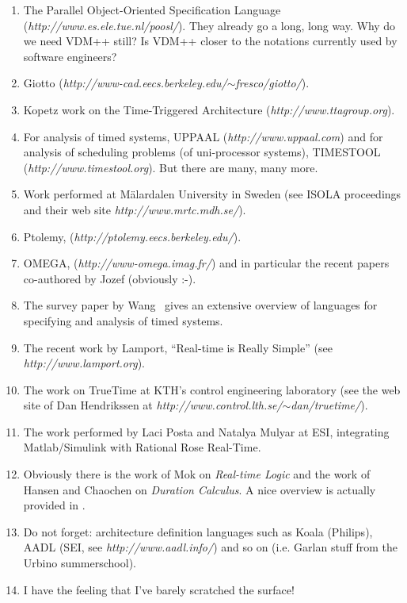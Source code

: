 \documentclass{llncs}
\begin{document}
\begin{enumerate}
\item The Parallel Object-Oriented Specification Language
(\textit{http://www.es.ele.tue.nl/poosl/}). They already go a long,
long way. Why do we need VDM++ still? Is VDM++ closer to the notations
currently used by software engineers?
\item Giotto (\textit{http://www-cad.eecs.berkeley.edu/$\sim$\/fresco/giotto/}).
\item Kopetz work on the Time-Triggered Architecture (\textit{http://www.ttagroup.org}).
\item For analysis of timed systems, UPPAAL (\textit{http://www.uppaal.com}) and
for analysis of scheduling problems (of uni-processor systems), TIMESTOOL
(\textit{http://www.timestool.org}). But there are many, many more.
\item Work performed at M\"{a}lardalen University in Sweden (see ISOLA proceedings
and their web site \textit{http://www.mrtc.mdh.se/}).
\item Ptolemy, (\textit{http://ptolemy.eecs.berkeley.edu/}).
\item OMEGA, (\textit{http://www-omega.imag.fr/}) and in particular the
recent papers co-authored by Jozef (obviously :-).
\item The survey paper by Wang~\cite{Wang04} gives an extensive
overview of languages for specifying and analysis of timed systems.
\item The recent work by Lamport, ``Real-time is Really Simple''
(see \textit{http://www.lamport.org}).
\item The work on TrueTime at KTH's control engineering laboratory (see the web site
of Dan Hendrikssen at \textit{http://www.control.lth.se/$\sim$\/dan/truetime/}).
\item The work performed by Laci Posta and Natalya Mulyar at ESI,
integrating Matlab/Simulink with Rational Rose Real-Time.
\item Obviously there is the work of Mok on \textit{Real-time Logic} and the
work of Hansen and Chaochen on \textit{Duration Calculus}. A nice overview is
actually provided in \cite{Mukherjee&00}.
\item Do not forget: architecture definition languages such as Koala
(Philips), AADL (SEI, see \textit{http://www.aadl.info/}) and so on
(i.e. Garlan stuff from the Urbino summerschool).
\item I have the feeling that I've barely scratched the surface!
\end{enumerate}
\end{document}
